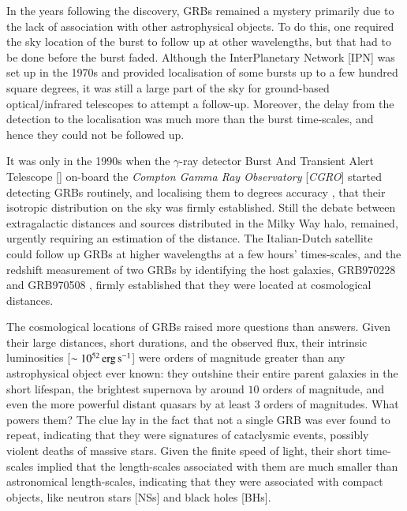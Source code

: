 In the years following the discovery, GRBs remained a mystery primarily due to the lack of association with other astrophysical objects. To do this, one required the sky location of the burst to follow up at other wavelengths, but that had to be done before the burst faded. Although the InterPlanetary Network [IPN] \citep{Cline_and_Desai-1976-Ap&SS} was set up in the 1970s and provided localisation of some bursts up to a few hundred square degrees, it was still a large part of the sky for ground-based optical/infrared telescopes to attempt a follow-up. Moreover, the delay from the detection to the localisation was much more than the burst time-scales, and hence they could not be followed up.

It was only in the 1990s when the $\gamma$-ray detector Burst And Transient Alert Telescope [\B] \citep{Fishman_et_al.-1989-BAAS} on-board the \emph{Compton Gamma Ray Observatory} [\emph{CGRO}] started detecting GRBs routinely, and localising them to degrees accuracy \citep{Briggs-1995-Ap&SS}, that their isotropic distribution on the sky was firmly established. Still the debate between extragalactic distances and sources distributed in the Milky Way halo, remained, urgently requiring an estimation of the distance. The Italian-Dutch satellite \bs\ \citep{Boella_et_al.-1997-A&AS} could follow up GRBs at higher wavelengths at a few hours' times-scales, and the redshift measurement of two GRBs by identifying the host galaxies, GRB970228 \citep{van_Paradijs_et_al.-1997-Nature} and GRB970508 \citep{Metzger_et_al.-1997-Nature}, firmly established that they were located at cosmological distances.

The cosmological locations of GRBs raised more questions than answers. Given their large distances, short durations, and the observed flux, their intrinsic luminosities [$\sim 10^{52} \, \rm erg \, s^{-1}$] were orders of magnitude greater than any astrophysical object ever known: they outshine their entire parent galaxies in the short lifespan, the brightest supernova by around $10$ orders of magnitude, and even the more powerful distant quasars by at least $3$ orders of magnitudes. What powers them? The clue lay in the fact that not a single GRB was ever found to repeat, indicating that they were signatures of cataclysmic events, possibly violent deaths of massive stars. Given the finite speed of light, their short time-scales implied that the length-scales associated with them are much smaller than astronomical length-scales, indicating that they were associated with compact objects, like neutron stars [NSs] and black holes [BHs].


